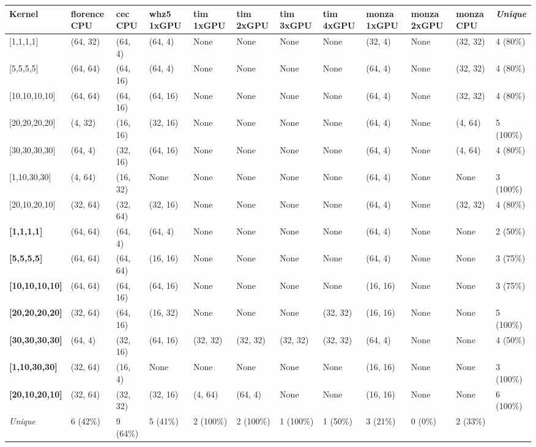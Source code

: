 \begin{tabular}{|p{1.8cm} | p{1cm} | p{1cm} | p{1cm} | p{1cm} | p{1cm} | p{1cm} | p{1cm} | p{1cm} | p{1cm} | p{1cm} | p{1.1cm}|}
\hline
\textbf{Kernel} & \textbf{florence CPU} & \textbf{cec CPU} & \textbf{whz5 1xGPU} & \textbf{tim 1xGPU} & \textbf{tim 2xGPU} & \textbf{tim 3xGPU} & \textbf{tim 4xGPU} & \textbf{monza 1xGPU} & \textbf{monza 2xGPU} & \textbf{monza CPU} & \textit{Unique}\\
\hline
{[}1,1,1,1{]} & (64, 32) & (64, 4) & (64, 4) & None & None & None & None & (32, 4) & None & (32, 32) & 4 (80\%)\\
{[}5,5,5,5{]} & (64, 64) & (64, 16) & (64, 4) & None & None & None & None & (64, 4) & None & (32, 32) & 4 (80\%)\\
{[}10,10,10,10{]} & (64, 64) & (64, 16) & (64, 16) & None & None & None & None & (64, 4) & None & (32, 32) & 4 (80\%)\\
{[}20,20,20,20{]} & (4, 32) & (16, 16) & (32, 16) & None & None & None & None & (64, 4) & None & (4, 64) & 5 (100\%)\\
{[}30,30,30,30{]} & (64, 4) & (32, 16) & (64, 16) & None & None & None & None & (64, 4) & None & (4, 64) & 4 (80\%)\\
{[}1,10,30,30{]} & (4, 64) & (16, 32) & None & None & None & None & None & (64, 4) & None & None & 3 (100\%)\\
{[}20,10,20,10{]} & (32, 64) & (32, 64) & (32, 16) & None & None & None & None & (64, 4) & None & (32, 32) & 4 (80\%)\\
\textbf{{[}1,1,1,1{]}} & (64, 64) & (64, 4) & (64, 4) & None & None & None & None & (64, 4) & None & None & 2 (50\%)\\
\textbf{{[}5,5,5,5{]}} & (64, 64) & (64, 64) & (16, 16) & None & None & None & None & (64, 4) & None & None & 3 (75\%)\\
\textbf{{[}10,10,10,10{]}} & (64, 64) & (64, 16) & (64, 16) & None & None & None & None & (16, 16) & None & None & 3 (75\%)\\
\textbf{{[}20,20,20,20{]}} & (32, 64) & (64, 16) & (16, 32) & None & None & None & (32, 32) & (16, 16) & None & None & 5 (100\%)\\
\textbf{{[}30,30,30,30{]}} & (64, 4) & (32, 16) & (64, 16) & (32, 32) & (32, 32) & (32, 32) & (32, 32) & (64, 4) & None & None & 4 (50\%)\\
\textbf{{[}1,10,30,30{]}} & (32, 64) & (16, 4) & None & None & None & None & None & (16, 16) & None & None & 3 (100\%)\\
\textbf{{[}20,10,20,10{]}} & (32, 64) & (32, 32) & (32, 16) & (4, 64) & (64, 4) & None & None & (16, 16) & None & None & 6 (100\%)\\
\hline
\textit{Unique} & 6 (42\%) & 9 (64\%) & 5 (41\%) & 2 (100\%) & 2 (100\%) & 1 (100\%) & 1 (50\%) & 3 (21\%) & 0 (0\%) & 2 (33\%) & \\
\hline
\end{tabular}
